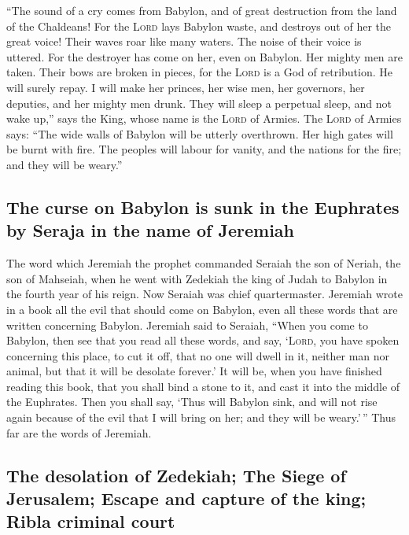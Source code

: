  ``The sound of a cry comes from Babylon, and of great
destruction from the land of the Chaldeans!  For the
\textsc{Lord} lays Babylon waste, and destroys out of her the great
voice! Their waves roar like many waters. The noise of their voice is
uttered.  For the destroyer has come on her, even on
Babylon. Her mighty men are taken. Their bows are broken in pieces, for
the \textsc{Lord} is a God of retribution. He will surely repay.
 I will make her princes, her wise men, her governors,
her deputies, and her mighty men drunk. They will sleep a perpetual
sleep, and not wake up,'' says the King, whose name is the \textsc{Lord}
of Armies.  The \textsc{Lord} of Armies says: ``The wide
walls of Babylon will be utterly overthrown. Her high gates will be
burnt with fire. The peoples will labour for vanity, and the nations for
the fire; and they will be weary.''

\hypertarget{the-curse-on-babylon-is-sunk-in-the-euphrates-by-seraja-in-the-name-of-jeremiah}{%
\subsection{The curse on Babylon is sunk in the Euphrates by Seraja in
the name of
Jeremiah}\label{the-curse-on-babylon-is-sunk-in-the-euphrates-by-seraja-in-the-name-of-jeremiah}}

 The word which Jeremiah the prophet commanded Seraiah
the son of Neriah, the son of Mahseiah, when he went with Zedekiah the
king of Judah to Babylon in the fourth year of his reign. Now Seraiah
was chief quartermaster.  Jeremiah wrote in a book all
the evil that should come on Babylon, even all these words that are
written concerning Babylon.  Jeremiah said to Seraiah,
``When you come to Babylon, then see that you read all these words,
 and say, `\textsc{Lord}, you have spoken concerning this
place, to cut it off, that no one will dwell in it, neither man nor
animal, but that it will be desolate forever.'  It will
be, when you have finished reading this book, that you shall bind a
stone to it, and cast it into the middle of the Euphrates.
 Then you shall say, `Thus will Babylon sink, and will
not rise again because of the evil that I will bring on her; and they
will be weary.'\,'' Thus far are the words of Jeremiah.

\hypertarget{the-desolation-of-zedekiah-the-siege-of-jerusalem-escape-and-capture-of-the-king-ribla-criminal-court}{%
\subsection{The desolation of Zedekiah; The Siege of Jerusalem; Escape
and capture of the king; Ribla criminal
court}\label{the-desolation-of-zedekiah-the-siege-of-jerusalem-escape-and-capture-of-the-king-ribla-criminal-court}}

